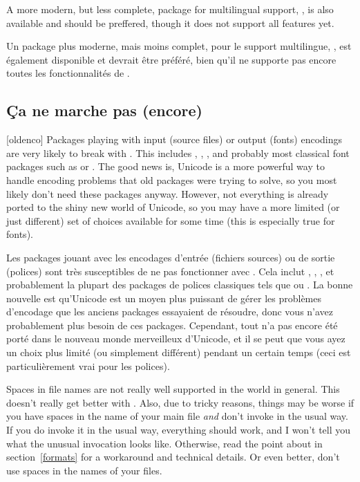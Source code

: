 \documentclass{lltxdoc}
\begin{document}
{
A more modern, but less complete, package for multilingual support,
, is also available and should be preffered, though it does
not support all  features yet.

Un package plus moderne, mais moins complet, pour le support multilingue, , est également disponible et devrait être préféré, bien qu'il ne supporte pas encore toutes les fonctionnalités de .

\subsection{Ça ne marche pas (encore)}\label{notworking}

[oldenco] Packages playing with input (source files) or
output (fonts) encodings are very likely to break with \luatex. This includes
, , , and probably most classical font
packages such as  or . The good news
is, Unicode is a more powerful way to handle encoding problems that old
packages were trying to solve, so you most likely don't need these packages
anyway. However, not everything is already ported to the shiny new world of
Unicode, so you may have a more limited (or just different) set of choices
available for some time (this is especially true for fonts).

Les packages jouant avec les encodages d'entrée (fichiers sources) ou de sortie (polices) sont très susceptibles de ne pas fonctionner avec \luatex. Cela inclut , , , et probablement la plupart des packages de polices classiques tels que  ou . La bonne nouvelle est qu'Unicode est un moyen plus puissant de gérer les problèmes d'encodage que les anciens packages essayaient de résoudre, donc vous n'avez probablement plus besoin de ces packages. Cependant, tout n'a pas encore été porté dans le nouveau monde merveilleux d'Unicode, et il se peut que vous ayez un choix plus limité (ou simplement différent) pendant un certain temps (ceci est particulièrement vrai pour les polices).

 Spaces in file names are not really well supported in the \tex
world in general. This doesn't really get better with \luatex. Also, due to
tricky reasons, things may be worse if you have spaces in the name of your main
\tex file \emph{and} don't invoke \luatex in the usual way. If you do
invoke it in the usual way, everything should work, and I won't tell you what
the unusual invocation looks like. Otherwise, read the point about
 in section~\ref{formats} for a workaround and technical
details. Or even better, don't use spaces in the names of your \tex files.

}
\end{document}
